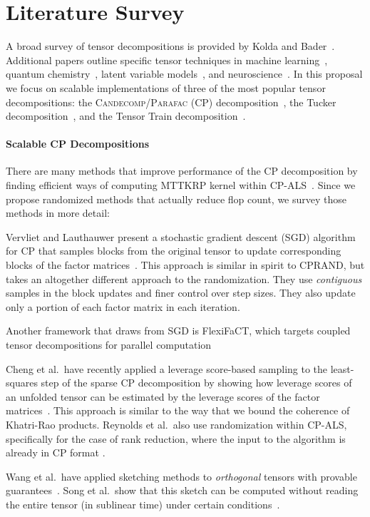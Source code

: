 \section{Literature Survey}
A broad survey of tensor decompositions is provided by Kolda and Bader~\cite{Kolda:2009}. Additional papers outline specific tensor techniques in machine learning~\cite{nikossurvey}, quantum chemistry~\cite{quantumsurvey}, latent variable models~\cite{Anandk}, and neuroscience~\cite{eegsurvey}. In this proposal we focus on scalable implementations of three of the most popular tensor decompositions: the \textsc{Candecomp/Parafac} (CP) decomposition~\cite{hitchcock-sum-1927, CANDECOMP, PARAFAC}, the Tucker decomposition~\cite{Tu66}, and the Tensor Train decomposition~\cite{tensortrain}. 

\paragraph{Scalable CP Decompositions}
There are many methods that improve performance of the CP decomposition by finding efficient ways of computing MTTKRP kernel within CP-ALS~\cite{SPLATT,dimtree,koby,jiajia2}. Since we propose randomized methods that actually reduce flop count, we survey those methods in more detail:

Vervliet and Lauthauwer present a stochastic gradient descent (SGD) algorithm for CP that samples blocks from the original tensor to update corresponding blocks of the factor matrices~\cite{VeLa16}. This approach is similar in spirit to CPRAND, but takes an altogether different approach to the randomization. They use \emph{contiguous} samples in the block updates and finer control over step sizes. They also update only a portion of each factor matrix in each iteration.

Another framework that draws from SGD is FlexiFaCT, which targets coupled tensor decompositions for parallel computation~\cite{flexifact}

Cheng et al.~have recently applied a leverage score-based sampling to the least-squares step of the sparse CP decomposition by showing how leverage scores of an unfolded tensor can be estimated by the leverage scores of the factor matrices~\cite{spals}. This approach is similar to the way that we bound the coherence of Khatri-Rao products. 
Reynolds et al.~also use randomization within CP-ALS, specifically for the case of rank reduction, where the input to the algorithm is already in CP format \cite{RDB16}.

Wang et al.~have applied sketching methods to \emph{orthogonal} tensors with provable guarantees~\cite{anand}. Song et al.~show that this sketch can be computed without reading the entire tensor (in sublinear time) under certain conditions~\cite{sublinear}.

